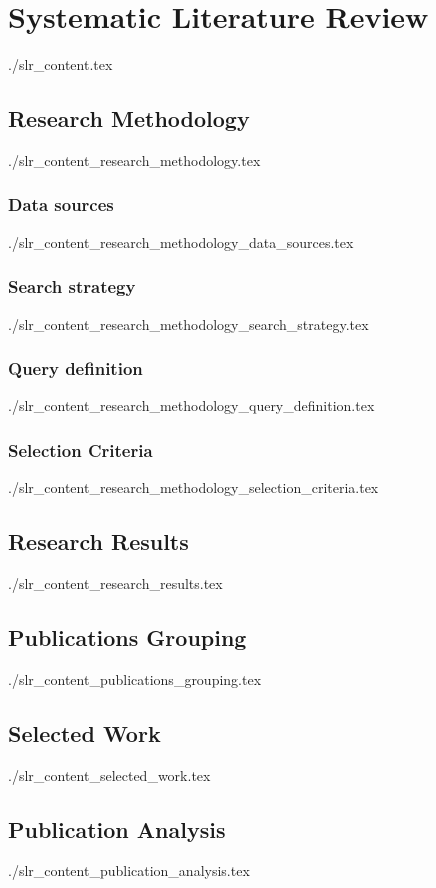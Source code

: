 \chapter{Systematic Literature Review}
  {./slr_content.tex}

\section{Research Methodology} \label{sub:research-methodology}
  {./slr_content_research_methodology.tex}
  \subsection{Data sources}
  {./slr_content_research_methodology_data_sources.tex}
  \subsection{Search strategy}
  {./slr_content_research_methodology_search_strategy.tex}
  \subsection{Query definition}
  {./slr_content_research_methodology_query_definition.tex}
  \subsection{Selection Criteria} \label{sub:selection-criteria}
  {./slr_content_research_methodology_selection_criteria.tex}

\section{Research Results}
  {./slr_content_research_results.tex}

\section{Publications Grouping}
  {./slr_content_publications_grouping.tex}

\section{Selected Work}
  {./slr_content_selected_work.tex}

\section{Publication Analysis} \label{sub:publication-analysis}
  {./slr_content_publication_analysis.tex}

